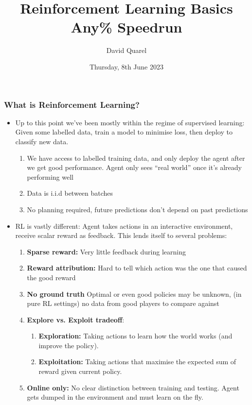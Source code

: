 \documentclass[10pt,a4paper]{beamer}
\begin{document}
\title[Reinforcement Learning Basics Any\% Speedrun] %
{Reinforcement Learning Basics Any\% Speedrun }

 
\author[David Quarel] %
{David Quarel}
 
 
\date[8th June 2023] %
{Thursday, 8th June 2023}
 
\frame{\titlepage}

\begin{frame}
\frametitle{What is Reinforcement Learning?}
\begin{itemize}
	\item Up to this point we've been mostly within the regime of 
	supervised learning: Given some labelled data, train a model to
	minimise loss, then deploy to classify new data.
	\begin{enumerate}
		\pause 
		\item We have access to labelled training data, and only deploy
		the agent after we get good performance. Agent only sees 
		``real world'' once it's already performing well
		\pause 
		\item Data is i.i.d between batches
		\pause 
		\item No planning required, future predictions don't depend on past
		predictions
		\pause
	\end{enumerate}  
	\item RL is vastly different: Agent takes actions in an interactive environment,
	receive scalar reward as feedback. This lends itself to several problems:
	\pause
	\begin{enumerate}
		\item  \textbf{Sparse reward:} Very little feedback during learning 
		\pause
		\item \textbf{Reward attribution:} Hard to tell which action
		was the one that caused the good reward
		\pause
		\item \textbf{No ground truth} Optimal or even good policies
		may be unknown, (in pure RL settings) no data from good players to compare against
		\pause
		\item \textbf{Explore vs. Exploit tradeoff}: 
		\begin{enumerate}
			\item \textbf{Exploration:} Taking actions to learn how the 
			world works (and improve the policy).
			\item \textbf{Exploitation:} Taking actions that maximise the expected sum of reward given current policy.
		\end{enumerate}
	\pause 
	\item \textbf{Online only:} No clear distinction between training and testing.
	Agent gets dumped in the environment and must learn on the fly. 
	\end{enumerate} 
\end{itemize}
	
\end{frame}
\end{document}
